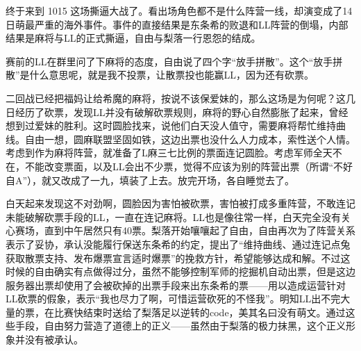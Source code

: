 
终于来到 1015 这场撕逼大战了。看出场角色都不是什么阵营一线，却演变成了14日萌最严重的海外事件。事件的直接结果是东条希的败退和LL阵营的倒塌，内部结果是麻将与LL的正式撕逼，自由与梨落一行恩怨的结成。

赛前的LL在群里问了下麻将的态度，自由说了四个字“放手拼散”。这个“放手拼散”是什么意思呢，就是我不投票，让散票投也能赢LL，因为还有砍票。

二回战已经把福妈让给希魔的麻将，按说不该保爱妹的，那么这场是为何呢？这几日经历了砍票，发现LL并没有破解砍票规则，麻将的野心自然膨胀了起来，曾经想到过爱妹的胜利。这时圆脸找来，说他们白天没人值守，需要麻将帮忙维持曲线。自由一想，圆麻联盟坚固如铁，这边出票也没什么人力成本，索性送个人情。考虑到作为麻将阵营，就准备了L麻三七比例的票面连记圆脸。考虑军师全天不在，不能改变票面，以及LL会出不少票，觉得不应该为别的阵营出票（所谓“不好自A”），就又改成了一九，填装了上去。放完开场，各自睡觉去了。

白天起来发现这不对劲啊，圆脸因为害怕被砍票，害怕被打成多重阵营，不敢连记未能破解砍票手段的LL，一直在连记麻将。LL也是像往常一样，白天完全没有关心赛场，直到中午居然只有40票。梨落开始嚷嚷起了自由，自由再次为了阵营关系表示了妥协，承认没能履行保送东条希的约定，提出了“维持曲线、通过连记点兔获取散票支持、发布爆票宣言适时爆票”的挽救方针，希望能够达成和解。不过这时候的自由确实有点做得过分，虽然不能够控制军师的挖掘机自动出票，但是这边服务器出票却使用了会被砍掉的出票手段来出东条希的票——用以造成运营针对LL砍票的假象，表示“我也尽力了啊，可惜运营砍死的不怪我”。明知LL出不完大量的票，在比赛快结束时送给了梨落足以逆转的code，美其名曰没有萌文。通过这些手段，自由努力营造了道德上的正义——虽然由于梨落的极力抹黑，这个正义形象并没有被承认。

